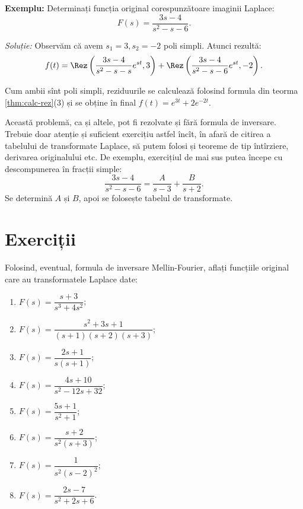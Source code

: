 \textbf{Exemplu:} Determinați funcția original corespunzătoare imaginii
Laplace:
\[
    F(s) = \dfrac{3s - 4}{s^2 - s - 6}.
\]

\emph{Soluție:} Observăm că avem $ s_1 = 3, s_2 = -2 $ poli simpli.
Atunci rezultă:
\[
    f(t) = \Rez\left( \dfrac{3s - 4}{s^2 - s - s} e^{st}, 3\right) + %
    \Rez\left( \dfrac{3s - 4}{s^2 - s - 6} e^{st}, -2 \right).
\]

Cum ambii sînt poli simpli, reziduurile se calculează folosind
formula din teorma \ref{thm:calc-rez}(3) și se obține în final
$ f(t) = e^{3t} + 2e^{-2t} $.

\begin{remark}\label{rk:no-mellin}
    Această problemă, ca și altele, pot fi rezolvate și fără formula de inversare.
    Trebuie doar atenție și suficient exercițiu astfel încît, în afară de citirea
     a tabelului de transformate Laplace, să putem folosi și teoreme
    de tip întîrziere, derivarea originalului etc. De exemplu, exercițiul de mai
    sus putea începe cu descompunerea în fracții simple:
    \[
        \dfrac{3s - 4}{s^2 - s - 6} = \dfrac{A}{s - 3} + \dfrac{B}{s + 2}.
    \]
    Se determină $ A $ și $ B $, apoi se folosește tabelul de transformate.
\end{remark}

\section{Exerciții}

Folosind, eventual, formula de inversare Mellin-Fourier, aflați funcțiile original
care au transformatele Laplace date:
\begin{enumerate}[(1)]
    \item $ F(s) = \dfrac{s + 3}{s^3 + 4s^2} $;
    \item $ F(s) = \dfrac{s^2 + 3s + 1}{(s + 1)(s + 2)(s + 3)} $;
    \item $ F(s) = \dfrac{2s + 1}{s(s + 1)} $;
    \item $ F(s) = \dfrac{4s + 10}{s^2 - 12s + 32} $;
    \item $ F(s) = \dfrac{5s + 1}{s^2 + 1} $;
    \item $ F(s) = \dfrac{s + 2}{s^2(s + 3)} $;
    \item $ F(s) = \dfrac{1}{s^2(s - 2)^2} $;
    \item $ F(s) = \dfrac{2s - 7}{s^2 + 2s + 6} $.
\end{enumerate}



